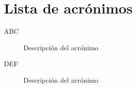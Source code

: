 \chapter{Lista de acrónimos}

\begin{description}
	\item [ABC] Descripción del acrónimo
	
	\item [DEF] Descripción del acrónimo
\end{description}